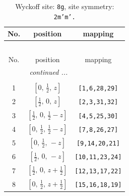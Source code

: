 \documentclass[fleqn,8pt]{jsarticle}
\begin{document}
\begin{longtable}{ccc}
\caption{Wyckoff site: {\tt 8g}, site symmetry: {\tt 2m'm'.}}
 \\
 \hline \hline
No. & position & mapping \\ \hline \endfirsthead

\multicolumn{2}{l}{\tablename\ \thetable{}} \\
 \hline \hline
No. & position & mapping \\ \hline \endhead

 \hline \hline
\multicolumn{2}{r}{\footnotesize\it continued ...} \\ \endfoot

 \hline \hline
\multicolumn{2}{r}{} \\ \endlastfoot

1 & $\left[ 0,\, \frac{1}{2},\, z \right]$ & {\tt [1,6,28,29]} \\ \hline
2 & $\left[ \frac{1}{2},\, 0,\, z \right]$ & {\tt [2,3,31,32]} \\ \hline
3 & $\left[ \frac{1}{2},\, 0,\, \frac{1}{2} - z \right]$ & {\tt [4,5,25,30]} \\ \hline
4 & $\left[ 0,\, \frac{1}{2},\, \frac{1}{2} - z \right]$ & {\tt [7,8,26,27]} \\ \hline
5 & $\left[ 0,\, \frac{1}{2},\, - z \right]$ & {\tt [9,14,20,21]} \\ \hline
6 & $\left[ \frac{1}{2},\, 0,\, - z \right]$ & {\tt [10,11,23,24]} \\ \hline
7 & $\left[ \frac{1}{2},\, 0,\, z + \frac{1}{2} \right]$ & {\tt [12,13,17,22]} \\ \hline
8 & $\left[ 0,\, \frac{1}{2},\, z + \frac{1}{2} \right]$ & {\tt [15,16,18,19]} \\
\end{longtable}
\renewcommand{\arraystretch}{1.2}
\end{document}
